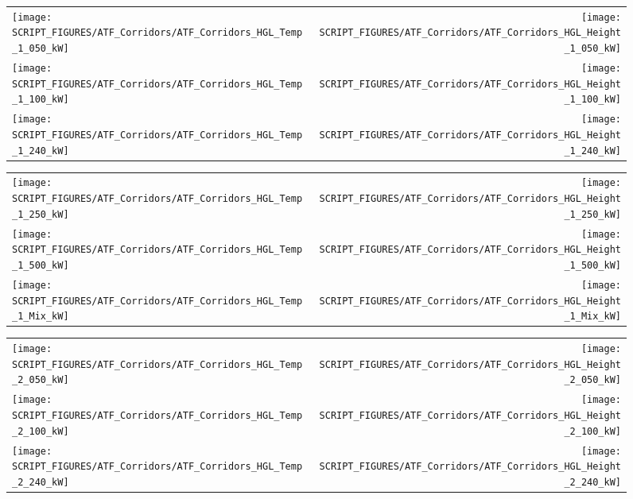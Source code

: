 \begin{figure}[h!]
\begin{tabular*}{\textwidth}{l@{\extracolsep{\fill}}r}
\texttt{[image: SCRIPT\_FIGURES/ATF\_Corridors/ATF\_Corridors\_HGL\_Temp\_1\_050\_kW]} &
\texttt{[image: SCRIPT\_FIGURES/ATF\_Corridors/ATF\_Corridors\_HGL\_Height\_1\_050\_kW]} \\
\texttt{[image: SCRIPT\_FIGURES/ATF\_Corridors/ATF\_Corridors\_HGL\_Temp\_1\_100\_kW]} &
\texttt{[image: SCRIPT\_FIGURES/ATF\_Corridors/ATF\_Corridors\_HGL\_Height\_1\_100\_kW]} \\
\texttt{[image: SCRIPT\_FIGURES/ATF\_Corridors/ATF\_Corridors\_HGL\_Temp\_1\_240\_kW]} &
\texttt{[image: SCRIPT\_FIGURES/ATF\_Corridors/ATF\_Corridors\_HGL\_Height\_1\_240\_kW]}
\end{tabular*}
\end{figure}

\newpage

\begin{figure}[p]
\begin{tabular*}{\textwidth}{l@{\extracolsep{\fill}}r}
\texttt{[image: SCRIPT\_FIGURES/ATF\_Corridors/ATF\_Corridors\_HGL\_Temp\_1\_250\_kW]} &
\texttt{[image: SCRIPT\_FIGURES/ATF\_Corridors/ATF\_Corridors\_HGL\_Height\_1\_250\_kW]} \\
\texttt{[image: SCRIPT\_FIGURES/ATF\_Corridors/ATF\_Corridors\_HGL\_Temp\_1\_500\_kW]} &
\texttt{[image: SCRIPT\_FIGURES/ATF\_Corridors/ATF\_Corridors\_HGL\_Height\_1\_500\_kW]} \\
\texttt{[image: SCRIPT\_FIGURES/ATF\_Corridors/ATF\_Corridors\_HGL\_Temp\_1\_Mix\_kW]} &
\texttt{[image: SCRIPT\_FIGURES/ATF\_Corridors/ATF\_Corridors\_HGL\_Height\_1\_Mix\_kW]}
\end{tabular*}
\end{figure}

\begin{figure}[p]
\begin{tabular*}{\textwidth}{l@{\extracolsep{\fill}}r}
\texttt{[image: SCRIPT\_FIGURES/ATF\_Corridors/ATF\_Corridors\_HGL\_Temp\_2\_050\_kW]} &
\texttt{[image: SCRIPT\_FIGURES/ATF\_Corridors/ATF\_Corridors\_HGL\_Height\_2\_050\_kW]} \\
\texttt{[image: SCRIPT\_FIGURES/ATF\_Corridors/ATF\_Corridors\_HGL\_Temp\_2\_100\_kW]} &
\texttt{[image: SCRIPT\_FIGURES/ATF\_Corridors/ATF\_Corridors\_HGL\_Height\_2\_100\_kW]} \\
\texttt{[image: SCRIPT\_FIGURES/ATF\_Corridors/ATF\_Corridors\_HGL\_Temp\_2\_240\_kW]} &
\texttt{[image: SCRIPT\_FIGURES/ATF\_Corridors/ATF\_Corridors\_HGL\_Height\_2\_240\_kW]}
\end{tabular*}
\end{figure}

